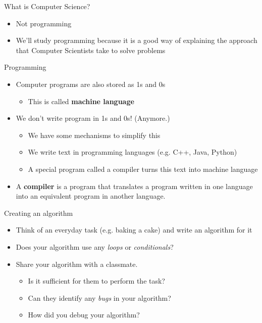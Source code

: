 \documentclass[aspectratio=169]{beamer}
\begin{document}
\begin{frame}{What is Computer Science?}
    \begin{itemize}[label=--]
        \item Not programming
        \item We'll study programming because it is a good way of explaining the approach that Computer Scientists take to solve problems
    \end{itemize}
\end{frame}


\begin{frame}{Programming}
    \begin{itemize}[label=--]
        \item Computer programs are also stored as 1s and 0s
            \begin{itemize}[label=\(\blacktriangleright\),itemsep=5pt]
                \item This is called \textbf{machine language}
            \end{itemize}
        \item We don't write program in 1s and 0s! (Anymore.)
            \begin{itemize}[label=\(\blacktriangleright\),itemsep=5pt]
                \item We have some mechanisms to simplify this
                \item We write text in programming languages (e.g. C++, Java, Python)
                \item A special program called a compiler turns this text into machine language
            \end{itemize}
        \item A \textbf{compiler} is a program that translates a program written in one language into an equivalent program in another language.
    \end{itemize}
\end{frame}


\begin{frame}{Creating an algorithm}
    \begin{itemize}[label=--]
        \item Think of an everyday task (e.g. baking a cake) and write an algorithm for it
        \item Does your algorithm use any \textit{loops} or \textit{conditionals}?
        \item Share your algorithm with a classmate.
            \begin{itemize}[label=\(\blacktriangleright\),itemsep=5pt]
                \item Is it sufficient for them to perform the task?
                \item Can they identify any \textit{bugs} in your algorithm?
                \item How did you debug your algorithm?
            \end{itemize}
    \end{itemize}
\end{frame}
\end{document}
